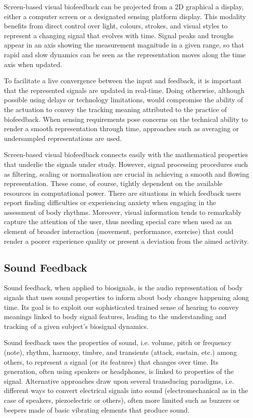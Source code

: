 Screen-based visual biofeedback can be projected from a 2D graphical a display, either a computer screen or a designated sensing platform display. This modality benefits from direct control over light, colours, strokes, and visual styles to represent a changing signal that evolves with time. Signal peaks and troughs appear in an axis showing the measurement magnitude in a given range, so that rapid and slow dynamics can be seen as the representation moves along the time axis when updated.

To facilitate a live convergence between the input and feedback, it is important that the represented signals are updated in real-time. Doing otherwise, although possible using delays or technology limitations, would compromise the ability of the actuation to convey the tracking meaning attributed to the practice of biofeedback. When sensing requirements pose concerns on the technical ability to render a smooth representation through time, approaches such as averaging or undersampled representations are used.

Screen-based visual biofeedback connects easily with the mathematical properties that underlie the signals under study. However, signal processing procedures such as filtering, scaling or normalisation are crucial in achieving a smooth and flowing representation. These come, of course, tightly dependent on the available resources in computational power.
There are situations in which feedback users report finding difficulties or experiencing anxiety when engaging in the assessment of body rhythms. Moreover, visual information tends to remarkably capture the attention of the user, thus needing special care when used as an element of broader interaction (movement, performance, exercise) that could render a poorer experience quality or present a deviation from the aimed activity.

\subsection*{Sound Feedback}

Sound feedback, when applied to biosignals, is the audio representation of body signals that uses sound properties to inform about body changes happening along time. Its goal is to exploit our sophisticated trained sense of hearing to convey meanings linked to body signal features, leading to the understanding and tracking of a given subject’s biosignal dynamics.

Sound feedback uses the properties of sound, i.e. volume, pitch or frequency (note), rhythm, harmony, timbre, and transients (attack, sustain, etc.) among others, to represent a signal (or its features) that changes over time. Its generation, often using speakers or headphones, is linked to properties of the signal. Alternative approaches draw upon several transducing paradigms, i.e. different ways to convert electrical signals into sound (electromechanical as in the case of speakers, piezoelectric or others), often more limited such as buzzers or beepers made of basic vibrating elements that produce sound.

